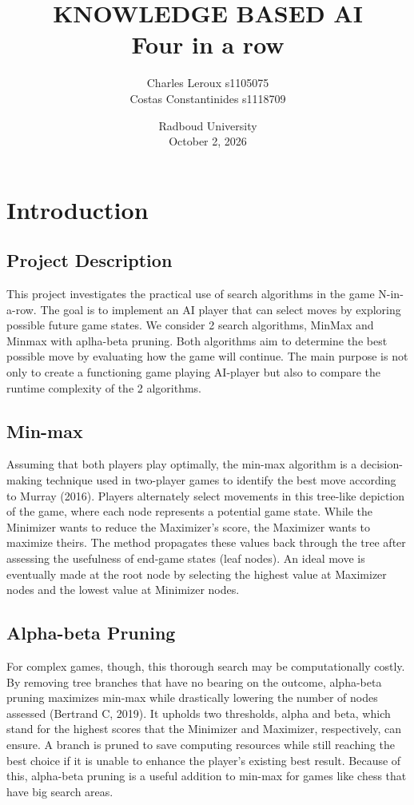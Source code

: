 \documentclass[11pt,a4paper]{article}
\title{\textbf{KNOWLEDGE BASED AI}\\[0.7em]Four in a row}
\author{Charles Leroux s1105075 \\ Costas Constantinides s1118709}
\date{Radboud University\\October 2, 2026}
\begin{document}
\maketitle

\section{Introduction}

\subsection{Project Description}

This project investigates the practical use of search algorithms in the game N-in-a-row. The goal is to implement an AI player that can select moves by exploring possible future game states. We consider 2 search algorithms, MinMax and Minmax with aplha-beta pruning. Both algorithms aim to determine the best possible move by evaluating how the game will continue. The main purpose is not only to create a functioning game playing AI-player but also to compare the runtime complexity of the 2 algorithms.  

\subsection{Min-max}
Assuming that both players play optimally, the min-max algorithm is a decision-making technique used in two-player games to identify the best move according to Murray (2016). Players alternately select movements in this tree-like depiction of the game, where each node represents a potential game state. While the Minimizer wants to reduce the Maximizer's score, the Maximizer wants to maximize theirs. The method propagates these values back through the tree after assessing the usefulness of end-game states (leaf nodes). An ideal move is eventually made at the root node by selecting the highest value at Maximizer nodes and the lowest value at Minimizer nodes.

\subsection{Alpha-beta Pruning}
For complex games, though, this thorough search may be computationally costly. By removing tree branches that have no bearing on the outcome, alpha-beta pruning maximizes min-max while drastically lowering the number of nodes assessed (Bertrand C, 2019). It upholds two thresholds, alpha and beta, which stand for the highest scores that the Minimizer and Maximizer, respectively, can ensure. A branch is pruned to save computing resources while still reaching the best choice if it is unable to enhance the player's existing best result. Because of this, alpha-beta pruning is a useful addition to min-max for games like chess that have big search areas.
\end{document}
